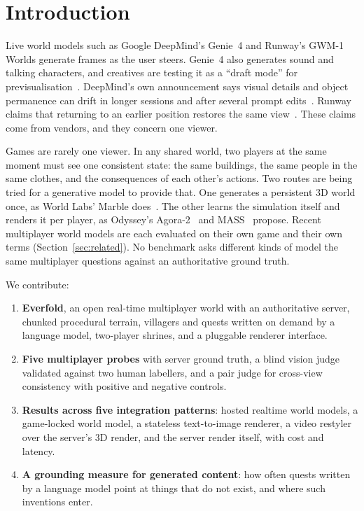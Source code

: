 \documentclass[conference]{IEEEtran}
\begin{document}
\section{Introduction}

Live world models such as Google DeepMind's Genie~4 and Runway's GWM-1 Worlds generate frames as the user steers. Genie~4 also generates sound and talking characters, and creatives are testing it as a ``draft mode'' for previsualisation~\cite{genie4}. DeepMind's own announcement says visual details and object permanence can drift in longer sessions and after several prompt edits~\cite{genie4}. Runway claims that returning to an earlier position restores the same view~\cite{gwm1}. These claims come from vendors, and they concern one viewer.

Games are rarely one viewer. In any shared world, two players at the same moment must see one consistent state: the same buildings, the same people in the same clothes, and the consequences of each other's actions. Two routes are being tried for a generative model to provide that. One generates a persistent 3D world once, as World Labs' Marble does~\cite{marble}. The other learns the simulation itself and renders it per player, as Odyssey's Agora-2~\cite{agora2} and MASS~\cite{mass} propose. Recent multiplayer world models are each evaluated on their own game and their own terms (Section~\ref{sec:related}). No benchmark asks different kinds of model the same multiplayer questions against an authoritative ground truth.

We contribute:
\begin{enumerate}
\item \textbf{Everfold}, an open real-time multiplayer world with an authoritative server, chunked procedural terrain, villagers and quests written on demand by a language model, two-player shrines, and a pluggable renderer interface.
\item \textbf{Five multiplayer probes} with server ground truth, a blind vision judge validated against two human labellers, and a pair judge for cross-view consistency with positive and negative controls.
\item \textbf{Results across five integration patterns}: hosted realtime world models, a game-locked world model, a stateless text-to-image renderer, a video restyler over the server's 3D render, and the server render itself, with cost and latency.
\item \textbf{A grounding measure for generated content}: how often quests written by a language model point at things that do not exist, and where such inventions enter.
\end{enumerate}
\end{document}
